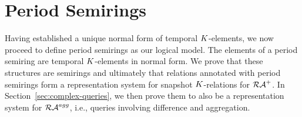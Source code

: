 

\section{Period Semirings}
\label{sec:interv-temp-annot}

Having established a unique normal form of temporal $K$-elements,
we now proceed to define period semirings as our logical model. The elements of a period semiring are temporal
$K$-elements in normal form. We prove that these structures are
semirings and ultimately that relations annotated with period semirings form a
representation system for snapshot $K$-relations for $\mathcal{RA}^{+}$. In
Section~\ref{sec:complex-queries}, we then prove them to also be a
representation system for $\mathcal{RA}^{agg}$, i.e., queries involving difference
and aggregation.

